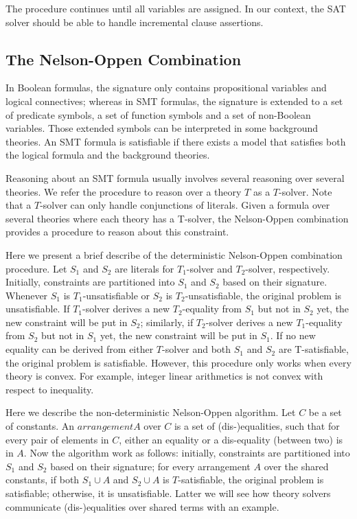 The procedure continues until all variables are assigned. In our context, the SAT solver should be able to handle incremental clause assertions. 

\subsection{The Nelson-Oppen Combination}
\label{sec:The Nelson-Oppen Combination}
In Boolean formulas, the signature only contains propositional variables and logical connectives; whereas in SMT formulas, the signature is extended to a set of predicate symbols, a set of function symbols and a set of non-Boolean variables. Those extended symbols can be interpreted in some background theories. An SMT formula is satisfiable if there exists a model that satisfies both the logical formula and the background theories.

Reasoning about an SMT formula usually involves several reasoning over several theories. We refer the procedure to reason over a theory \(T\) as a \(T\)-solver. Note that a \(T\)-solver can only handle conjunctions of literals. Given a formula over several theories where each theory has a T-solver, the Nelson-Oppen combination provides a procedure to reason about this constraint.

Here we present a brief describe of the deterministic Nelson-Oppen combination procedure. Let \(S_1\) and \(S_2\) are literals for \(T_1\)-solver and \(T_2\)-solver, respectively. Initially, constraints are partitioned into \(S_1\) and \(S_2\) based on their signature. Whenever \(S_1\) is \(T_1\)-unsatisfiable or \(S_2\) is \(T_2\)-unsatisfiable, the original problem is unsatisfiable. If \(T_1\)-solver derives a new \(T_2\)-equality from \(S_1\) but not in \(S_2\) yet, the new constraint will be put in \(S_2\); similarly, if \(T_2\)-solver derives a new \(T_1\)-equality from \(S_2\) but not in \(S_1\) yet, the new constraint will be put in \(S_1\). If no new equality can be derived from either \(T\)-solver and both \(S_1\) and \(S_2\) are T-satisfiable, the original problem is satisfiable. However, this procedure only works when every theory is convex. For example, integer linear arithmetics is not convex with respect to inequality.

Here we describe the non-deterministic Nelson-Oppen algorithm.  Let \(C\) be a set of constants. An \(arrangement A\) over \(C\) is a set of (dis-)equalities, such that for every pair of elements in \(C\), either an equality or a dis-equality (between two) is in \(A\). Now the algorithm work as follows: initially, constraints are partitioned into \(S_1\) and \(S_2\) based on their signature; for every arrangement \(A\) over the shared constants, if both \(S_1 \cup A\) and \(S_2 \cup A\) is \(T\)-satisfiable, the original problem is satisfiable; otherwise, it is unsatisfiable. Latter we will see how theory solvers communicate (dis-)equalities over shared terms with an example.


